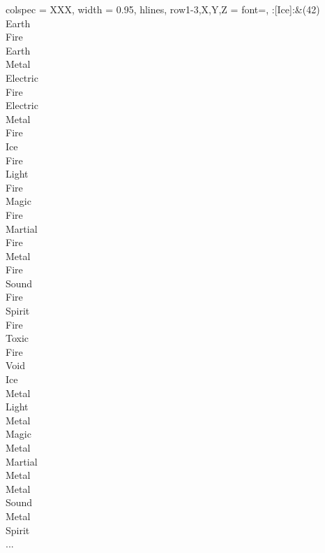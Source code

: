 \begin{longtblr}[
	caption = {2v1 Defending Resisted},
	label = {2v1-Defending-Resisted},
]{
	colspec = {XXX}, width = 0.95\linewidth,
	hlines,
	row{1-3,X,Y,Z} = {font=\bfseries},
}
	:[Ice]:&{(42)\\
	Earth \\
	Fire \\
	Earth \\
	Metal \\
	Electric \\
	Fire \\
	Electric \\
	Metal \\
	Fire \\
	Ice \\
	Fire \\
	Light \\
	Fire \\
	Magic \\
	Fire \\
	Martial \\
	Fire \\
	Metal \\
	Fire \\
	Sound \\
	Fire \\
	Spirit \\
	Fire \\
	Toxic \\
	Fire \\
	Void \\
	Ice \\
	Metal \\
	Light \\
	Metal \\
	Magic \\
	Metal \\
	Martial \\
	Metal \\
	Metal \\
	Sound \\
	Metal \\
	Spirit \\
	...\\
	}\\


\end{longtblr}
